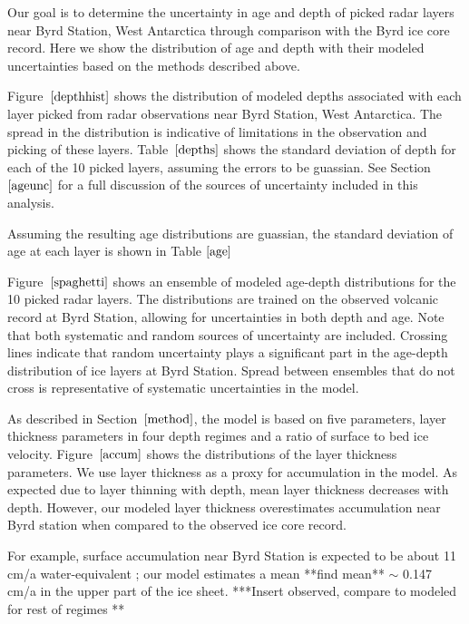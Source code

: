 \documentclass[jgrga]{agutex}
\begin{document}
\begin{article}
	Our goal is to determine the uncertainty in age and depth of picked radar layers near Byrd Station, West Antarctica through comparison with the Byrd ice core record. Here we show the distribution of age and depth with their modeled uncertainties based on the methods described above. 



Figure~$\ref{depthhist}$ shows the distribution of modeled depths associated with each layer picked from radar observations near Byrd Station, West Antarctica. The spread in the distribution is indicative of limitations in the observation and picking of these layers. Table~$\ref{depths}$ shows the standard deviation of depth for each of the 10 picked layers, assuming the errors to be guassian. See Section~$\ref{ageunc}$ for a full discussion of the sources of uncertainty included in this analysis.




Assuming the resulting age distributions are guassian, the standard deviation of age at each layer is shown in Table $\ref{age}$



Figure~$\ref{spaghetti}$ shows an ensemble of modeled age-depth distributions for the 10 picked radar layers. The distributions are trained on the observed volcanic record at Byrd Station, allowing for uncertainties in both depth and age. Note that both systematic and random sources of uncertainty are included. Crossing lines indicate that random uncertainty plays a significant part in the age-depth distribution of ice layers at Byrd Station. Spread between ensembles that do not cross is representative of systematic uncertainties in the model. 




As described in Section~$\ref{method}$, the model is based on five parameters, layer thickness parameters in four depth regimes and a ratio of surface to bed ice velocity. Figure~$\ref{accum}$ shows the distributions of the layer thickness parameters. We use layer thickness as a proxy for accumulation in the model. As expected due to layer thinning with depth, mean layer thickness decreases with depth. However, our modeled layer thickness overestimates accumulation near Byrd station when compared to the observed ice core record.

For example, surface accumulation near Byrd Station is expected to be about 11 cm/a water-equivalent \citep{who?}; our model estimates a mean **find mean** $\sim$ 0.147 cm/a in the upper part of the ice sheet. ***Insert observed, compare to modeled for rest of regimes **




\end{article}
\end{document}
